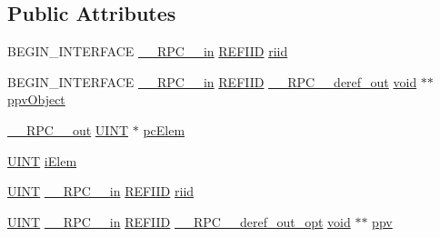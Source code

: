 \subsection*{Public Attributes}
\begin{DoxyCompactItemize}
\item 
B\+E\+G\+I\+N\+\_\+\+I\+N\+T\+E\+R\+F\+A\+CE \hyperlink{rpcsal_8h_a20b7f6da600a05c8b541659f14f7f0e6}{\+\_\+\+\_\+\+R\+P\+C\+\_\+\+\_\+in} \hyperlink{px__win__ds_8c_a80ec49c8ae61e234197d5071d2df497d}{R\+E\+F\+I\+ID} \hyperlink{struct_i_property_description_list_vtbl_a314c26361430b79aed953c862b695f7f}{riid}
\item 
B\+E\+G\+I\+N\+\_\+\+I\+N\+T\+E\+R\+F\+A\+CE \hyperlink{rpcsal_8h_a20b7f6da600a05c8b541659f14f7f0e6}{\+\_\+\+\_\+\+R\+P\+C\+\_\+\+\_\+in} \hyperlink{px__win__ds_8c_a80ec49c8ae61e234197d5071d2df497d}{R\+E\+F\+I\+ID} \hyperlink{rpcsal_8h_a23bc188526f10656f9c79d950f6c3192}{\+\_\+\+\_\+\+R\+P\+C\+\_\+\+\_\+deref\+\_\+out} \hyperlink{sound_8c_ae35f5844602719cf66324f4de2a658b3}{void} $\ast$$\ast$ \hyperlink{struct_i_property_description_list_vtbl_a56cb57bc76ce9ed78155e1438c44836e}{ppv\+Object}
\item 
\hyperlink{rpcsal_8h_aa518a2c78d44d75f3685c32c455c5ed8}{\+\_\+\+\_\+\+R\+P\+C\+\_\+\+\_\+out} \hyperlink{mapinls_8h_a36cb3b01d81ffd844bbbfb54003e06ec}{U\+I\+NT} $\ast$ \hyperlink{struct_i_property_description_list_vtbl_aabf6c24ceb6972597d38b95c69dcc6ea}{pc\+Elem}
\item 
\hyperlink{mapinls_8h_a36cb3b01d81ffd844bbbfb54003e06ec}{U\+I\+NT} \hyperlink{struct_i_property_description_list_vtbl_a3ef897a5f74cc55b05270e873743f6a1}{i\+Elem}
\item 
\hyperlink{mapinls_8h_a36cb3b01d81ffd844bbbfb54003e06ec}{U\+I\+NT} \hyperlink{rpcsal_8h_a20b7f6da600a05c8b541659f14f7f0e6}{\+\_\+\+\_\+\+R\+P\+C\+\_\+\+\_\+in} \hyperlink{px__win__ds_8c_a80ec49c8ae61e234197d5071d2df497d}{R\+E\+F\+I\+ID} \hyperlink{struct_i_property_description_list_vtbl_a9197cd7934c60e22e9ff2a27365a9a01}{riid}
\item 
\hyperlink{mapinls_8h_a36cb3b01d81ffd844bbbfb54003e06ec}{U\+I\+NT} \hyperlink{rpcsal_8h_a20b7f6da600a05c8b541659f14f7f0e6}{\+\_\+\+\_\+\+R\+P\+C\+\_\+\+\_\+in} \hyperlink{px__win__ds_8c_a80ec49c8ae61e234197d5071d2df497d}{R\+E\+F\+I\+ID} \hyperlink{rpcsal_8h_ab29e89ceb0eb0b075c6f6299b0de6a21}{\+\_\+\+\_\+\+R\+P\+C\+\_\+\+\_\+deref\+\_\+out\+\_\+opt} \hyperlink{sound_8c_ae35f5844602719cf66324f4de2a658b3}{void} $\ast$$\ast$ \hyperlink{struct_i_property_description_list_vtbl_afab486965fdd1ab55bff9c70dcb9c860}{ppv}
\end{DoxyCompactItemize}


